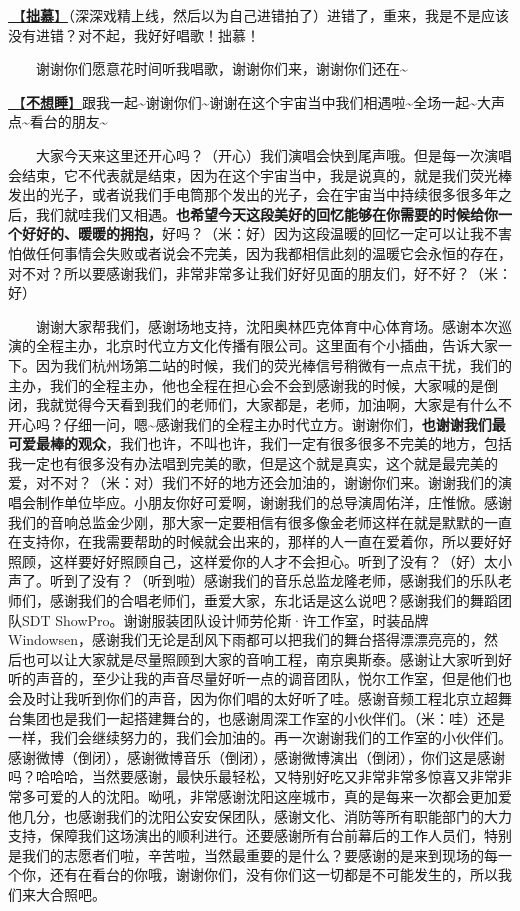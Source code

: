 \documentclass[]{ctexbook}
\begin{document}
\hyperref[inferior-admiration]{🎵【\textbf{拙慕}】}（深深戏精上线，然后以为自己进错拍了）进错了，重来，我是不是应该没有进错？对不起，我好好唱歌！拙慕！

  谢谢你们愿意花时间听我唱歌，谢谢你们来，谢谢你们还在\textasciitilde{}

\hyperref[keep-playing]{🎵【\textbf{不想睡}】}跟我一起\textasciitilde 谢谢你们\textasciitilde 谢谢在这个宇宙当中我们相遇啦\textasciitilde 全场一起\textasciitilde 大声点\textasciitilde 看台的朋友\textasciitilde{}

  大家今天来这里还开心吗？（开心）我们演唱会快到尾声哦。但是每一次演唱会结束，它不代表就是结束，因为在这个宇宙当中，我是说真的，就是我们荧光棒发出的光子，或者说我们手电筒那个发出的光子，会在宇宙当中持续很多很多年之后，我们就哇我们又相遇。\textbf{也希望今天这段美好的回忆能够在你需要的时候给你一个好好的、暖暖的拥抱，}好吗？（米：好）因为这段温暖的回忆一定可以让我不害怕做任何事情会失败或者说会不完美，因为我都相信此刻的温暖它会永恒的存在，对不对？所以要感谢我们，非常非常多让我们好好见面的朋友们，好不好？（米：好）

  谢谢大家帮我们，感谢场地支持，沈阳奥林匹克体育中心体育场。感谢本次巡演的全程主办，北京时代立方文化传播有限公司。这里面有个小插曲，告诉大家一下。因为我们杭州场第二站的时候，我们的荧光棒信号稍微有一点点干扰，我们的主办，我们的全程主办，他也全程在担心会不会到感谢我的时候，大家喊的是倒闭，我就觉得今天看到我们的老师们，大家都是，老师，加油啊，大家是有什么不开心吗？仔细一问，嗯\textasciitilde 感谢我们的全程主办时代立方。谢谢你们，\textbf{也谢谢我们最可爱最棒的观众}，我们也许，不叫也许，我们一定有很多很多不完美的地方，包括我一定也有很多没有办法唱到完美的歌，但是这个就是真实，这个就是最完美的爱，对不对？（米：对）我们不好的地方还会加油的，谢谢你们来。谢谢我们的演唱会制作单位毕应。小朋友你好可爱啊，谢谢我们的总导演周佑洋，庄惟惞。感谢我们的音响总监金少刚，那大家一定要相信有很多像金老师这样在就是默默的一直在支持你，在我需要帮助的时候就会出来的，那样的人一直在爱着你，所以要好好照顾，这样要好好照顾自己，这样爱你的人才不会担心。听到了没有？（好）太小声了。听到了没有？（听到啦）感谢我们的音乐总监龙隆老师，感谢我们的乐队老师们，感谢我们的合唱老师们，垂爱大家，东北话是这么说吧？感谢我们的舞蹈团队SDT ShowPro。谢谢服装团队设计师劳伦斯·许工作室，时装品牌Windowsen，感谢我们无论是刮风下雨都可以把我们的舞台搭得漂漂亮亮的，然后也可以让大家就是尽量照顾到大家的音响工程，南京奥斯泰。感谢让大家听到好听的声音的，至少让我的声音尽量好听一点的调音团队，悦尔工作室，但是他们也会及时让我听到你们的声音，因为你们唱的太好听了哇。感谢音频工程北京立超舞台集团也是我们一起搭建舞台的，也感谢周深工作室的小伙伴们。（米：哇）还是一样，我们会继续努力的，我们会加油的。再一次谢谢我们的工作室的小伙伴们。感谢微博（倒闭），感谢微博音乐（倒闭），感谢微博演出（倒闭），你们这是感谢吗？哈哈哈，当然要感谢，最快乐最轻松，又特别好吃又非常非常多惊喜又非常非常多可爱的人的沈阳。呦吼，非常感谢沈阳这座城市，真的是每来一次都会更加爱他几分，也感谢我们的沈阳公安安保团队，感谢文化、消防等所有职能部门的大力支持，保障我们这场演出的顺利进行。还要感谢所有台前幕后的工作人员们，特别是我们的志愿者们啦，辛苦啦，当然最重要的是什么？要感谢的是来到现场的每一个你，还有在看台的你哦，谢谢你们，没有你们这一切都是不可能发生的，所以我们来大合照吧。
\end{document}
